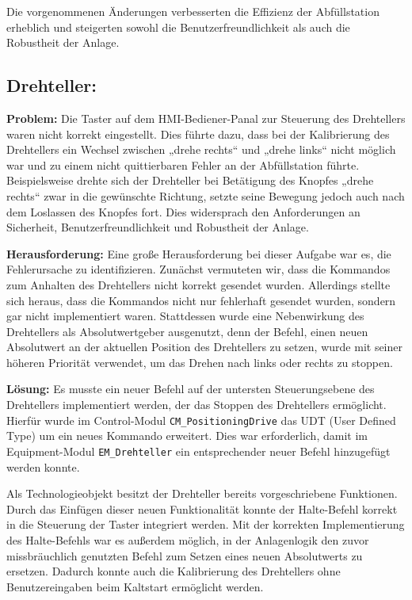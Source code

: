Die vorgenommenen Änderungen verbesserten die Effizienz der Abfüllstation erheblich und steigerten sowohl die Benutzerfreundlichkeit als 
auch die Robustheit der Anlage.

\subsection{Drehteller:} 
\textbf{Problem:}  
Die Taster auf dem HMI-Bediener-Panal zur Steuerung des Drehtellers waren nicht korrekt eingestellt. Dies führte dazu, dass bei der Kalibrierung des Drehtellers ein 
Wechsel zwischen „drehe rechts“ und „drehe links“ nicht möglich war und zu einem nicht quittierbaren Fehler an der Abfüllstation führte. 
Beispielsweise drehte sich der Drehteller bei Betätigung des Knopfes „drehe rechts“ zwar in die gewünschte Richtung, setzte seine Bewegung 
jedoch auch nach dem Loslassen des Knopfes fort. Dies widersprach den Anforderungen an Sicherheit, Benutzerfreundlichkeit und Robustheit 
der Anlage.  

\textbf{Herausforderung:}  
Eine große Herausforderung bei dieser Aufgabe war es, die Fehlerursache zu identifizieren. Zunächst vermuteten wir, dass die Kommandos zum 
Anhalten des Drehtellers nicht korrekt gesendet wurden. Allerdings stellte sich heraus, dass die Kommandos nicht nur fehlerhaft gesendet wurden, 
sondern gar nicht implementiert waren. Stattdessen wurde eine Nebenwirkung des Drehtellers als Absolutwertgeber ausgenutzt, denn der Befehl, einen 
neuen Absolutwert an der aktuellen Position des Drehtellers zu setzen, wurde mit seiner höheren Priorität verwendet, um das Drehen nach links 
oder rechts zu stoppen.  

\textbf{Lösung:}  
Es musste ein neuer Befehl auf der untersten Steuerungsebene des Drehtellers implementiert werden, der das Stoppen des Drehtellers ermöglicht. 
Hierfür wurde im Control-Modul \texttt{CM\_PositioningDrive} das UDT (User Defined Type) um ein neues Kommando erweitert. Dies war erforderlich, 
damit im Equipment-Modul \texttt{EM\_Drehteller} ein entsprechender neuer Befehl hinzugefügt werden konnte.  

Als Technologieobjekt besitzt der Drehteller bereits vorgeschriebene Funktionen. Durch das Einfügen dieser neuen Funktionalität konnte der 
Halte-Befehl korrekt in die Steuerung der Taster integriert werden. Mit der korrekten Implementierung des 
Halte-Befehls war es außerdem möglich, in der Anlagenlogik den zuvor missbräuchlich genutzten Befehl zum Setzen eines neuen Absolutwerts zu 
ersetzen. Dadurch konnte auch die Kalibrierung des Drehtellers ohne Benutzereingaben beim Kaltstart ermöglicht werden.  


